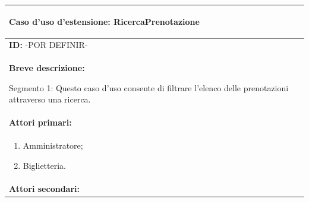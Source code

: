 \documentclass{article}
\begin{document}
                \begin{table}[t]
                    \centering
                    \begin{tabular}{|p{\linewidth}|}
                        \hline
                        \cellcolor{gray!100}
                        \color{white}
                        \begin{center}
                            \textbf{Caso d'uso d'estensione:} RicercaPrenotazione
                        \end{center} \\
                        \hline
                        \textbf{ID:} -POR DEFINIR- \\
                        \hline
                        \cellcolor{gray!20}
                        \textbf{Breve descrizione:}

                        Segmento 1: Questo caso d'uso consente di filtrare l'elenco delle prenotazioni attraverso una ricerca. \\
                        \hline
                        \textbf{Attori primari:} \\
                        \begin{minipage}{\linewidth}
                            \begin{enumerate}[noitemsep]
                                \item Amministratore;
                                \item Biglietteria.
                            \end{enumerate}
                        \end{minipage}
                        \vspace{-5pt} \\
                        \hline
                        \textbf{Attori secondari:}


\end{tabular}
\end{table}
\end{document}
